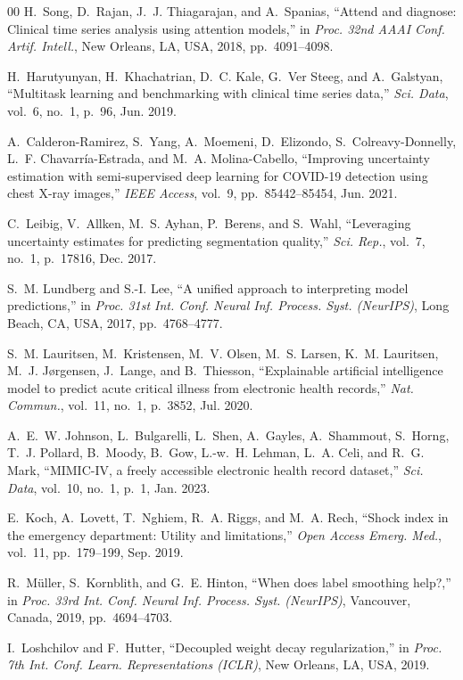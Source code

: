 \documentclass[runningheads]{llncs}
\begin{document}
\begin{thebibliography}{00}
H.~Song, D.~Rajan, J.~J. Thiagarajan, and A.~Spanias, ``Attend and diagnose: Clinical time series analysis using attention models,'' in \textit{Proc. 32nd AAAI Conf. Artif. Intell.}, New Orleans, LA, USA, 2018, pp.~4091--4098.

H.~Harutyunyan, H.~Khachatrian, D.~C. Kale, G.~Ver Steeg, and A.~Galstyan, ``Multitask learning and benchmarking with clinical time series data,'' \textit{Sci. Data}, vol.~6, no.~1, p.~96, Jun. 2019.

A.~Calderon-Ramirez, S.~Yang, A.~Moemeni, D.~Elizondo, S.~Colreavy-Donnelly, L.~F. Chavarr\'{i}a-Estrada, and M.~A. Molina-Cabello, ``Improving uncertainty estimation with semi-supervised deep learning for COVID-19 detection using chest X-ray images,'' \textit{IEEE Access}, vol.~9, pp.~85442--85454, Jun. 2021.

C.~Leibig, V.~Allken, M.~S. Ayhan, P.~Berens, and S.~Wahl, ``Leveraging uncertainty estimates for predicting segmentation quality,'' \textit{Sci. Rep.}, vol.~7, no.~1, p.~17816, Dec. 2017.

S.~M. Lundberg and S.-I. Lee, ``A unified approach to interpreting model predictions,'' in \textit{Proc. 31st Int. Conf. Neural Inf. Process. Syst. (NeurIPS)}, Long Beach, CA, USA, 2017, pp.~4768--4777.

S.~M. Lauritsen, M.~Kristensen, M.~V. Olsen, M.~S. Larsen, K.~M. Lauritsen, M.~J. J{\o}rgensen, J.~Lange, and B.~Thiesson, ``Explainable artificial intelligence model to predict acute critical illness from electronic health records,'' \textit{Nat. Commun.}, vol.~11, no.~1, p.~3852, Jul. 2020.

A.~E.~W. Johnson, L.~Bulgarelli, L.~Shen, A.~Gayles, A.~Shammout, S.~Horng, T.~J. Pollard, B.~Moody, B.~Gow, L.-w.~H. Lehman, L.~A. Celi, and R.~G. Mark, ``MIMIC-IV, a freely accessible electronic health record dataset,'' \textit{Sci. Data}, vol.~10, no.~1, p.~1, Jan. 2023.

E.~Koch, A.~Lovett, T.~Nghiem, R.~A. Riggs, and M.~A. Rech, ``Shock index in the emergency department: Utility and limitations,'' \textit{Open Access Emerg. Med.}, vol.~11, pp.~179--199, Sep. 2019.

R.~M\"{u}ller, S.~Kornblith, and G.~E. Hinton, ``When does label smoothing help?,'' in \textit{Proc. 33rd Int. Conf. Neural Inf. Process. Syst. (NeurIPS)}, Vancouver, Canada, 2019, pp.~4694--4703.

I.~Loshchilov and F.~Hutter, ``Decoupled weight decay regularization,'' in \textit{Proc. 7th Int. Conf. Learn. Representations (ICLR)}, New Orleans, LA, USA, 2019.

\end{thebibliography}
\end{document}
